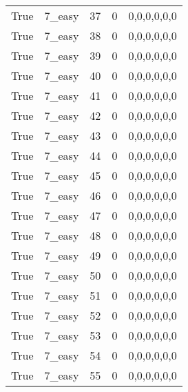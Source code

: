 \begin{tabular}{llrrl}
 True            & 7\_easy              &            37 &                     0 & 0,0,0,0,0,0   \\
 True            & 7\_easy              &            38 &                     0 & 0,0,0,0,0,0   \\
 True            & 7\_easy              &            39 &                     0 & 0,0,0,0,0,0   \\
 True            & 7\_easy              &            40 &                     0 & 0,0,0,0,0,0   \\
 True            & 7\_easy              &            41 &                     0 & 0,0,0,0,0,0   \\
 True            & 7\_easy              &            42 &                     0 & 0,0,0,0,0,0   \\
 True            & 7\_easy              &            43 &                     0 & 0,0,0,0,0,0   \\
 True            & 7\_easy              &            44 &                     0 & 0,0,0,0,0,0   \\
 True            & 7\_easy              &            45 &                     0 & 0,0,0,0,0,0   \\
 True            & 7\_easy              &            46 &                     0 & 0,0,0,0,0,0   \\
 True            & 7\_easy              &            47 &                     0 & 0,0,0,0,0,0   \\
 True            & 7\_easy              &            48 &                     0 & 0,0,0,0,0,0   \\
 True            & 7\_easy              &            49 &                     0 & 0,0,0,0,0,0   \\
 True            & 7\_easy              &            50 &                     0 & 0,0,0,0,0,0   \\
 True            & 7\_easy              &            51 &                     0 & 0,0,0,0,0,0   \\
 True            & 7\_easy              &            52 &                     0 & 0,0,0,0,0,0   \\
 True            & 7\_easy              &            53 &                     0 & 0,0,0,0,0,0   \\
 True            & 7\_easy              &            54 &                     0 & 0,0,0,0,0,0   \\
 True            & 7\_easy              &            55 &                     0 & 0,0,0,0,0,0   \\

\end{tabular}
